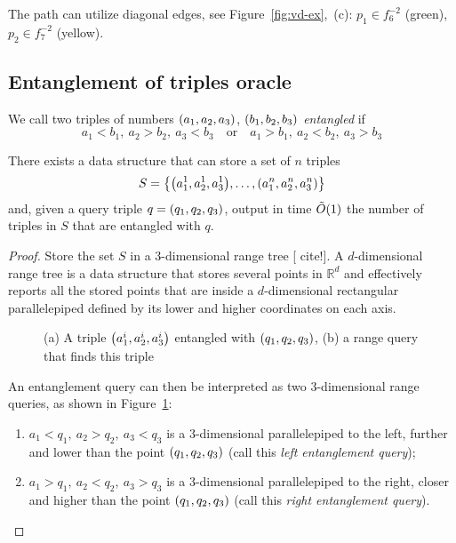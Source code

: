 \documentclass[a4paper,11pt]{article}
\begin{document}
The path can utilize diagonal edges, see Figure~\ref{fig:vd-ex},~(c): \(p_1 \in f_6^{-2}\) (green), \(p_2 \in f_7^{-2}\) (yellow).

\newpage

\subsection{Entanglement of triples oracle}

\begin{definition}
	We call two triples of numbers \(\lr*{a_1, a_2, a_3}\),
	\(\lr*{b_1, b_2, b_3}\) \emph{entangled} if
	\[ a_1 < b_1,\ a_2 > b_2,\ a_3 < b_3\quad\text{or}\quad
	   a_1 > b_1,\ a_2 < b_2,\ a_3 > b_3\]
\end{definition}

\begin{theorem} \label{thm:entgtripls}
	There exists a data structure that can store a set of \(n\) triples
	\[S = \set*{\lr*{a^1_1, a^1_2, a^1_3}, \ldots, \lr*{a^n_1, a^n_2, a^n_3}}\]
	and, given a query triple \(q = \lr*{q_1, q_2, q_3}\), output
	in time \(\Ot\lr*{1}\)  %
	the number of triples in \(S\) that are entangled with \(q\).
\end{theorem}

\begin{proof}
	Store the set \(S\) in a 3-dimensional range tree [{\color{magenta} cite!}].
	A \(d\)-dimensional range tree is a data structure that stores several points
	in \(\mathbb{R}^d\) and effectively reports all the stored points that are
	inside a \(d\)-dimensional rectangular parallelepiped defined by
	its lower and higher coordinates on each axis.

\begin{figure}[ht] \centering
	

	\caption{(a) A triple \(\lr*{a^i_1, a^i_2, a^i_3}\) entangled
	with \(\lr*{q_1, q_2, q_3}\),
	         (b) a range query that finds this triple}
	\label{fig:paral-trans}
\end{figure}

	An entanglement query can then be interpreted as two 3-dimensional range
	queries, as shown in Figure~\ref{fig:paral-trans}:
   \begin{enumerate}
	\item \(a_1 < q_1,\ a_2 > q_2,\ a_3 < q_3\) is a 3-dimensional parallelepiped
	  to the left, further and lower than the point \(\lr*{q_1, q_2, q_3}\)
	  (call this \emph{left entanglement query});
	\item \(a_1 > q_1,\ a_2 < q_2,\ a_3 > q_3\) is a 3-dimensional parallelepiped
	  to the right, closer and higher than the point \(\lr*{q_1, q_2, q_3}\)
	  (call this \emph{right entanglement query}).
   \end{enumerate}
\end{proof}
\end{document}
